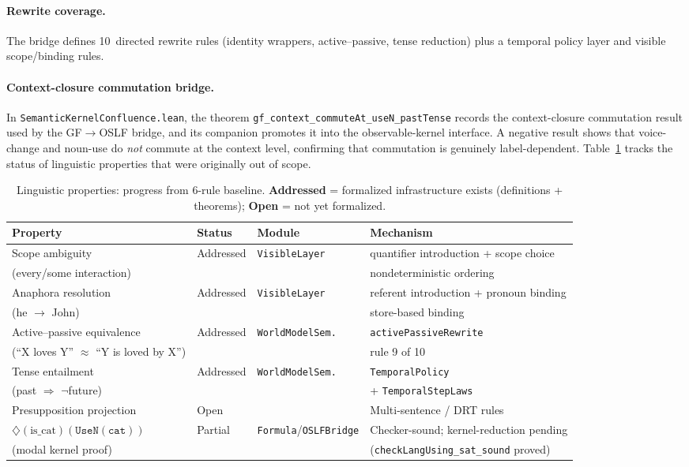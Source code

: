 \documentclass[11pt]{article}
\newcommand{\code}[1]{\texttt{#1}}
\newcommand{\Dia}{\ensuremath{\diamondsuit}}
\newcommand{\OSLF}{\textup{OSLF}}
\begin{document}
\paragraph{Rewrite coverage.}  The bridge defines 10~directed rewrite rules
(identity wrappers, active--passive, tense reduction) plus a temporal policy
layer and visible scope/binding rules.
\paragraph{Context-closure commutation bridge.}
In \code{SemanticKernelConfluence.lean},
the theorem \code{gf\_context\_commuteAt\_useN\_pastTense}
records the context-closure commutation result used by the
GF$\to$\OSLF{} bridge, and its companion promotes it into the
observable-kernel interface.  A negative result shows that
voice-change and noun-use do \emph{not} commute at the context level,
confirming that commutation is genuinely label-dependent.
Table~\ref{tab:negative} tracks the status of linguistic properties that
were originally out of scope.

\begin{table}[ht]
\centering
\caption{Linguistic properties: progress from 6-rule baseline.
  \textbf{Addressed} = formalized infrastructure exists (definitions +
  theorems); \textbf{Open} = not yet formalized.}
\label{tab:negative}
\small
\begin{tabular}{@{}llll@{}}
\toprule
\textbf{Property} & \textbf{Status} & \textbf{Module} & \textbf{Mechanism} \\
\midrule
Scope ambiguity            & Addressed & \code{VisibleLayer}     & quantifier introduction + scope choice \\
  (every/some interaction) &           &                         & nondeterministic ordering \\
Anaphora resolution        & Addressed & \code{VisibleLayer}     & referent introduction + pronoun binding \\
  (he $\to$ John)          &           &                         & store-based binding \\
Active--passive equivalence & Addressed & \code{WorldModelSem.}  & \code{activePassiveRewrite} \\
  (``X loves Y'' $\approx$ ``Y is loved by X'') & &             & rule 9 of 10 \\
Tense entailment           & Addressed & \code{WorldModelSem.}   & \code{TemporalPolicy} \\
  (past $\Rightarrow$ $\lnot$future) & &                        & + \code{TemporalStepLaws} \\
Presupposition projection  & Open      &                         & Multi-sentence / DRT rules \\
$\Dia(\text{is\_cat})(\code{UseN}(\code{cat}))$ & Partial & \code{Formula}/\code{OSLFBridge} & Checker-sound; kernel-reduction pending \\
  (modal kernel proof)     &           &                         & (\code{checkLangUsing\_sat\_sound} proved) \\
\bottomrule
\end{tabular}
\end{table}
\end{document}
